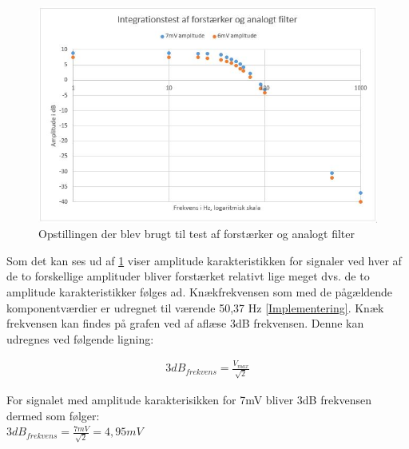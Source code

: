 \begin{figure}[H]
	\centering
	\includegraphics[width=1\textwidth]{Figurer/Hardware/IntegrationstestForstaerkerFilter2}
	\caption{Opstillingen der blev brugt til test af forstærker og analogt filter}
	\label{fig:ForstaerkerFilterGraf}
\end{figure}

Som det kan ses ud af \ref{fig:ForstaerkerFilterGraf} viser amplitude karakteristikken for signaler ved hver af de to forskellige amplituder bliver forstærket relativt lige meget dvs. de to amplitude karakteristikker følges ad.
Knækfrekvensen som med de pågældende komponentværdier er udregnet til værende 50,37 Hz \ref{Implementering}. Knæk frekvensen kan findes på grafen ved af aflæse 3dB frekvensen. Denne kan udregnes ved følgende ligning:
\begin{center}
\begin{align}
3dB_{frekvens}=\frac{V_{max}}{\sqrt{2}}
\end{align}
\end{center}
For signalet med amplitude karakterisikken for 7mV bliver 3dB frekvensen dermed som følger:\\
$3dB_{frekvens}=\frac{7mV}{\sqrt{2}}=4,95mV$

